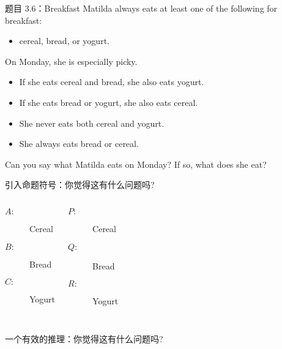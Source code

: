 \begin{frame}{}
  \begin{exampleblock}{题目 3.6：Breakfast}
    Matilda always eats at least one of the following for breakfast: \\
    \begin{itemize}
      \item cereal, bread, or yogurt. 
    \end{itemize}
    On Monday, she is especially picky.

    \begin{itemize}
      \item If she eats cereal and bread, she also eats yogurt.
      \item If she eats bread or yogurt, she also eats cereal.
      \item She never eats both cereal and yogurt.
      \item She always eats bread or cereal.
    \end{itemize}

    Can you say what Matilda eats on Monday? If so, what does she eat?
  \end{exampleblock}
\end{frame}

\begin{frame}{}
  引入命题符号：你觉得这有什么问题吗?
  \begin{columns}
      \begin{description}
	\item[$A:$] Cereal
	\item[$B:$] Bread
	\item[$C:$] Yogurt
      \end{description}
      \begin{description}
	\item[$P:$] Cereal
	\item[$Q:$] Bread
	\item[$R:$] Yogurt
      \end{description}
  \end{columns}

  \vspace{0.30cm}
  \pause
\end{frame}

\begin{frame}{}
  一个有效的推理：你觉得这有什么问题吗?
  
\end{frame}

